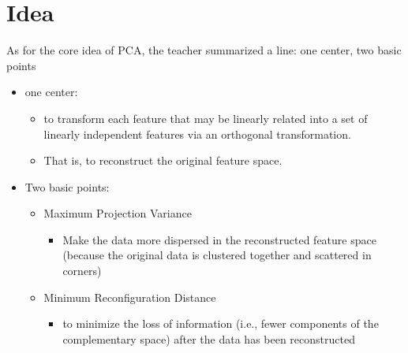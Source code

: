 \documentclass{report}
\begin{document}
\section{Idea}
As for the core idea of PCA, the teacher summarized a line: one center, two basic points
\begin{itemize}
	\item one center:
	\begin{itemize}
	\item to transform each feature that may be linearly related into a set of linearly independent features via an orthogonal transformation.
	\item That is, to reconstruct the original feature space.
	\end{itemize}
	\item Two basic points:
	\begin{itemize}
	\item Maximum Projection Variance
	\begin{itemize}
	\item Make the data more dispersed in the reconstructed feature space (because the original data is clustered together and scattered in corners)
	\end{itemize}
	\item Minimum Reconfiguration Distance
	\begin{itemize}
	\item to minimize the loss of information (i.e., fewer components of the complementary space) after the data has been reconstructed
	\end{itemize}
	\end{itemize}
\end{itemize}
\end{document}

